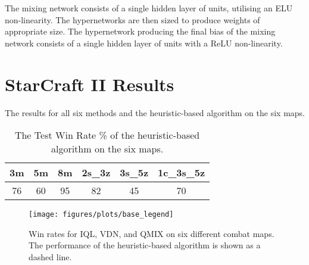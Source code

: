 \documentclass{article}
\begin{document}
The mixing network consists of a single hidden layer of  units, utilising an ELU non-linearity. The hypernetworks are then sized to produce weights of appropriate size. The hypernetwork producing the final bias of the mixing network consists of a single hidden layer of  units with a ReLU non-linearity.
 \section{StarCraft II Results}

The results for all six methods and the heuristic-based algorithm on the six maps.

\begin{table}[h]
	\setlength{\extrarowheight}{3pt}
	\centering
    \begin{center}
        \begin{tabular}{| c | c | c | c | c | c |}
        \hline
        \textbf{3m} & \textbf{5m} & \textbf{8m} & \textbf{2s\_3z} & \textbf{3s\_5z} & \textbf{1c\_3s\_5z} \\
        \hline
        76 & 60 & 95 & 82 & 45 & 70 \\ 
        \hline
        \end{tabular}
    \end{center}
    \caption{The Test Win Rate \% of the heuristic-based algorithm on the six maps.}
\end{table}

\begin{figure*}[htb!]
    \centering
    \texttt{[image: figures/plots/base\_legend]}
    \vfill
    \\
    \caption{Win rates for IQL, VDN, and QMIX on six different combat maps. The performance of the heuristic-based algorithm is shown as a dashed line.}
\end{figure*}
\end{document}
